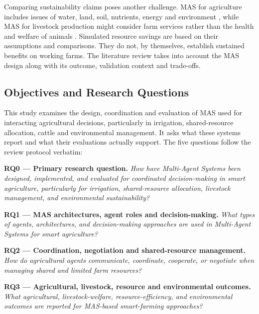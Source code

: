 \documentclass[11pt,a4paper]{article}
\begin{document}
Comparing sustainability claims poses another challenge. MAS for agriculture includes issues of water, land, soil, nutrients, energy and environment
\parencite{ng_agent-based_2011,quang_ex-ante_2014,
van_der_straeten_multi-agent_2010,balbi_multi-agent_2013,
ajagekar_energy_2024}, while MAS for livestock production might consider farm services rather than the health and welfare of animals
\parencite{t_shanteer_cownet-ai_2026}. Simulated resource savings are based on their assumptions and comparisons. They do not, by themselves, establish sustained benefits on working farms. The literature review takes into account the MAS design along with its outcome, validation context and trade-offs.

\subsection{Objectives and Research Questions}

This study examines the design, coordination and evaluation of MAS
used for interacting agricultural decisions, particularly in irrigation,
shared-resource allocation, cattle and environmental management.
It asks what these systems report and what their evaluations actually
support. The five questions follow the review protocol verbatim:

\smallskip
\noindent\textbf{RQ0 --- Primary research question.}
\emph{How have Multi-Agent Systems been designed, implemented, and evaluated for coordinated decision-making in smart agriculture, particularly for irrigation, shared-resource allocation, livestock management, and environmental sustainability?}\par\smallskip

\noindent\textbf{RQ1 --- MAS architectures, agent roles and decision-making.}
\emph{What types of agents, architectures, and decision-making approaches are used in Multi-Agent Systems for smart agriculture?}\par\smallskip

\noindent\textbf{RQ2 --- Coordination, negotiation and shared-resource management.}
\emph{How do agricultural agents communicate, coordinate, cooperate, or negotiate when managing shared and limited farm resources?}\par\smallskip

\noindent\textbf{RQ3 --- Agricultural, livestock, resource and environmental outcomes.}
\emph{What agricultural, livestock-welfare, resource-efficiency, and environmental outcomes are reported for MAS-based smart-farming approaches?}\par\smallskip
\end{document}
